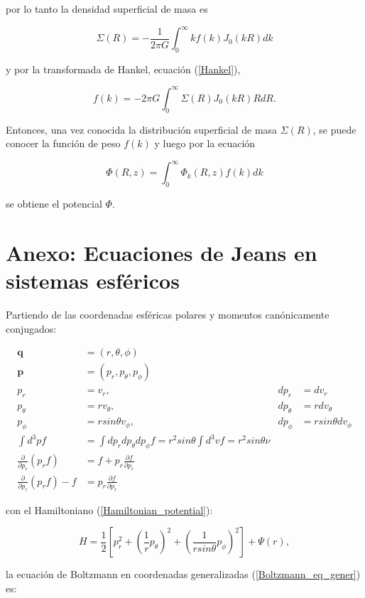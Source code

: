 \begin{appendix}
por lo tanto la densidad superficial de masa es

$$ \Sigma(R) = -\frac{1}{2\pi G} \int_0^{\infty} k f(k) J_0(kR) dk $$
 
 y por la transformada de Hankel, ecuación (\ref{Hankel}),
 
 $$ f(k) = -2\pi G \int_0^{\infty} \Sigma(R) J_0(kR)R dR. $$

 Entonces, una vez conocida la distribución superficial de masa $\Sigma(R)$, se puede conocer la función de peso $f(k)$ y luego por la ecuación
 
\begin{equation}
    \Phi(R,z) = \int_0^{\infty} \Phi_k(R,z) f(k) dk
\end{equation}
  
  se obtiene el potencial $\Phi$.
 

\chapter{Anexo: Ecuaciones de Jeans en sistemas esféricos}

Partiendo de las coordenadas esféricas polares y momentos canónicamente conjugados:

\begin{align*}
\textbf{q} &= (r, \theta, \phi) \\
\textbf{p} &= (p_r, p_\theta, p_\phi) \\
p_r &= v_r,  & d p_r &= d v_r \\
p_\theta &= r v_\theta,  & d p_\theta &= r d v_\theta \\
p_\phi &= r sin \theta v_\phi,  & d p_\phi &= r sin \theta d v_\phi \\
\int d^3 p f &= \int d p_r d p_\theta d p_\phi f = r^2 sin \theta \int d^3 v  f = r^2 sin \theta \nu \\
\frac{\partial }{ \partial p_r} (p_r f) &= f + p_r \frac{\partial f}{\partial p_r} \\
\frac{\partial }{\partial p_r} (p_r f) - f &= p_r \frac{\partial f}{\partial p_r}
\end{align*}


con el Hamiltoniano (\ref{Hamiltonian_potential}):

\begin{equation}
H = \frac{1}{2} \left [ p_r^2 + \left ( \frac{1}{r} p_\theta  \right )^2 + \left ( \frac{1}{r sin \theta} p_\phi  \right )^2 \right ] + \Psi (r),
\end{equation}

la ecuación de Boltzmann en coordenadas generalizadas (\ref{Boltzmann_eq_gener}) es:


\end{appendix}
